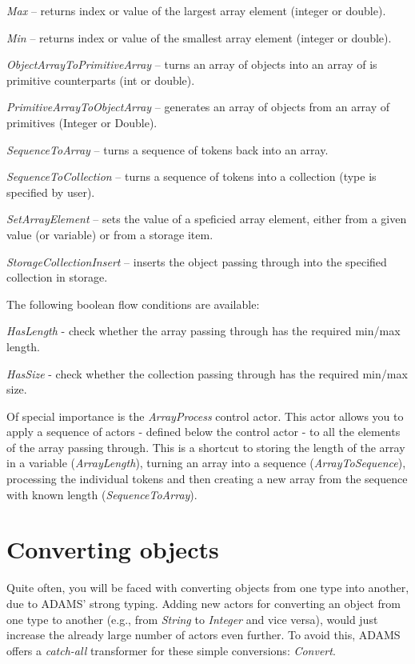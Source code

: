 \begin{tight_itemize}
	\item \textit{Max} -- returns index or value of the largest array element
	(integer or double).
	\item \textit{Min} -- returns index or value of the smallest array element
	(integer or double).
	\item \textit{ObjectArrayToPrimitiveArray} -- turns an array of objects
	into an array of is primitive counterparts (int or double).
	\item \textit{PrimitiveArrayToObjectArray} -- generates an array of objects
	from an array of primitives (Integer or Double).
	\item \textit{SequenceToArray} -- turns a sequence of tokens back into an
	array.
	\item \textit{SequenceToCollection} -- turns a sequence of tokens into a
	collection (type is specified by user).
	\item \textit{SetArrayElement} -- sets the value of a speficied array
	element, either from a given value (or variable) or from a storage item.
	\item \textit{StorageCollectionInsert} -- inserts the object passing through
	into the specified collection in storage.
\end{tight_itemize}
The following boolean flow conditions are available:
\begin{tight_itemize}
  \item \textit{HasLength} - check whether the array passing through has the required min/max length.
  \item \textit{HasSize} - check whether the collection passing through has the required min/max size.
\end{tight_itemize}
Of special importance is the \textit{ArrayProcess} control actor. This actor
allows you to apply a sequence of actors - defined below the control actor - to
all the elements of the array passing through. This is a shortcut to storing the
length of the array in a variable (\textit{ArrayLength}), turning an array into
a sequence (\textit{ArrayToSequence}), processing the individual tokens and then
creating a new array from the sequence with known length
(\textit{SequenceToArray}).

\clearpage
\section{Converting objects}
\label{converting_objects}
Quite often, you will be faced with converting objects from one type into
another, due to ADAMS' strong typing. Adding new actors for converting an object
from one type to another (e.g., from \textit{String} to \textit{Integer} and
vice versa), would just increase the already large number of actors even
further. To avoid this, ADAMS offers a \textit{catch-all} transformer for these
simple conversions: \textit{Convert}.

